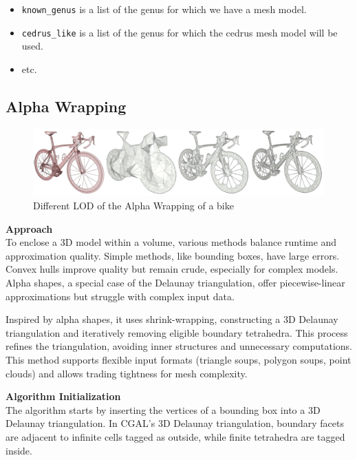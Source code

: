 \documentclass[12pt]{article}
\begin{document}
\begin{itemize}
    \item \texttt{known\_genus} is a list of the genus for which we have a mesh model.
    \item \texttt{cedrus\_like} is a list of the genus for which the cedrus mesh model will be used.
    \item etc.
\end{itemize}

\newpage

\subsection{Alpha Wrapping}
\begin{figure}[H]
    \centering
        \centering
        \includegraphics[width=\textwidth]{images/aw3_bike_lod.jpg}
        \caption{Different LOD of the Alpha Wrapping of a bike}
\end{figure}

\textbf{Approach}\\
To enclose a 3D model within a volume, various methods balance runtime and
approximation quality. Simple methods, like bounding boxes, have large errors.
Convex hulls improve quality but remain crude, especially for complex models.
Alpha shapes, a special case of the Delaunay triangulation, offer piecewise-linear
 approximations but struggle with complex input data.

Inspired by alpha shapes, it uses shrink-wrapping, constructing a 3D Delaunay
triangulation and iteratively removing eligible boundary tetrahedra. This process
 refines the triangulation, avoiding inner structures and unnecessary
 computations. This method supports flexible input formats (triangle soups,
 polygon soups, point clouds) and allows trading tightness for mesh complexity.

\textbf{Algorithm Initialization}\\
The algorithm starts by inserting the vertices of a bounding box into a 3D
Delaunay triangulation. In CGAL's 3D Delaunay triangulation, boundary facets
are adjacent to infinite cells tagged as outside, while finite tetrahedra are
tagged inside.
\end{document}
